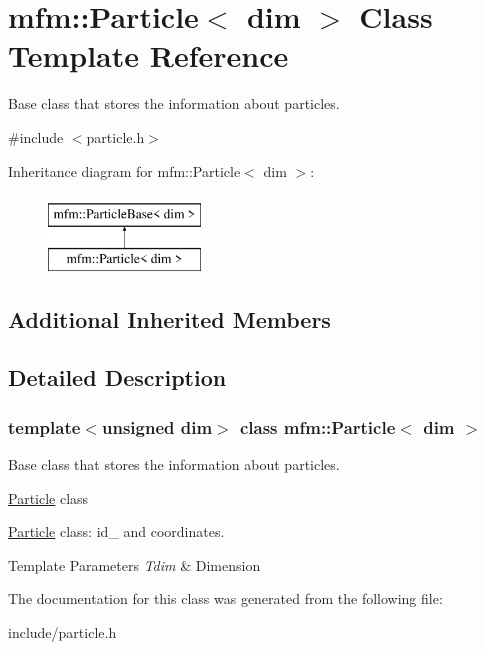 \hypertarget{classmfm_1_1_particle}{}\section{mfm\+:\+:Particle$<$ dim $>$ Class Template Reference}
\label{classmfm_1_1_particle}


Base class that stores the information about particles.  




{\ttfamily \#include $<$particle.\+h$>$}

Inheritance diagram for mfm\+:\+:Particle$<$ dim $>$\+:\begin{figure}[H]
\begin{center}
\leavevmode
\includegraphics[height=2.000000cm]{classmfm_1_1_particle}
\end{center}
\end{figure}
\subsection*{Additional Inherited Members}


\subsection{Detailed Description}
\subsubsection*{template$<$unsigned dim$>$\newline
class mfm\+::\+Particle$<$ dim $>$}

Base class that stores the information about particles. 

\hyperlink{classmfm_1_1_particle}{Particle} class

\hyperlink{classmfm_1_1_particle}{Particle} class\+: id\+\_\+ and coordinates. 
\begin{DoxyTemplParams}{Template Parameters}
{\em Tdim} & Dimension \\
\hline
\end{DoxyTemplParams}


The documentation for this class was generated from the following file\+:\begin{DoxyCompactItemize}
\item 
include/particle.\+h\end{DoxyCompactItemize}
